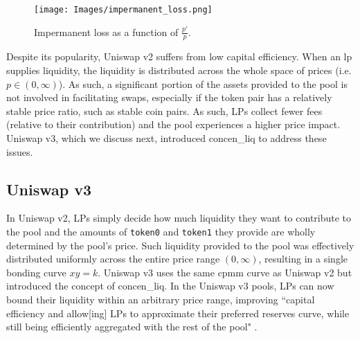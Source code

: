 \documentclass[11pt]{article}
\begin{document}
\begin{figure}[H]
    \centering
    \texttt{[image: Images/impermanent\_loss.png]}
    \caption{Impermanent loss as a function of $\frac{p'}{p}$.}
    \label{fig:impermanent_loss}
\end{figure}

Despite its popularity, Uniswap v2 suffers from low capital efficiency. When an \gls{lp} supplies liquidity, the liquidity is distributed across the whole space of prices (i.e. $p \in (0, \infty)$). As such, a significant portion of the assets provided to the pool is not involved in facilitating swaps, especially if the token pair has a relatively stable price ratio, such as stable coin pairs. As such, LPs collect fewer fees (relative to their contribution) and the pool experiences a higher price impact. Uniswap v3, which we discuss next, introduced \gls{concen_liq} to address these issues.

\subsection{Uniswap v3}

In Uniswap v2, LPs simply decide how much liquidity they want to contribute to the pool and the amounts of \texttt{token0} and \texttt{token1} they provide are wholly determined by the pool's price. Such liquidity provided to the pool was effectively distributed uniformly across the entire price range $(0, \infty)$, resulting in a single bonding curve $xy=k$. Uniswap v3 uses the same \gls{cpmm} curve as Uniswap v2 but introduced the concept of  \gls{concen_liq}. In the Uniswap v3 pools, LPs can now bound their liquidity within an arbitrary price range, improving ``capital efficiency and allow[ing] LPs to approximate their preferred reserves curve, while still being efficiently aggregated with the rest of the pool" \citep{Uniswapv3}.
\end{document}
